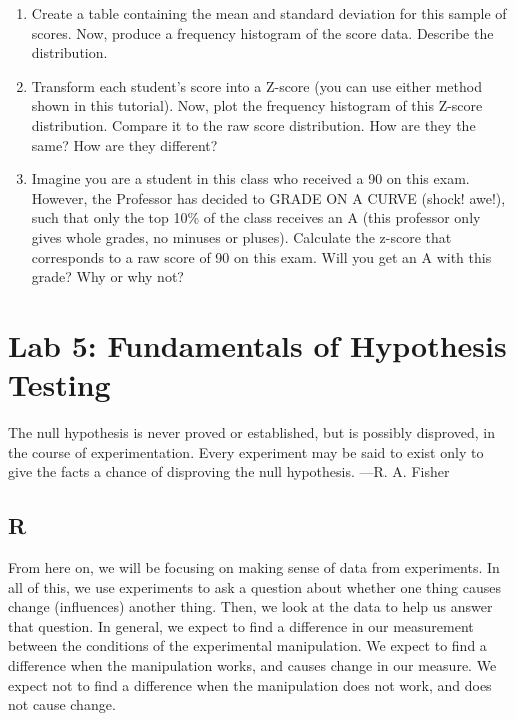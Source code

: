 \documentclass[
]{book}
\begin{document}
\begin{enumerate}
\def\labelenumi{\arabic{enumi}.}
\item
  Create a table containing the mean and standard deviation for this
  sample of scores. Now, produce a frequency histogram of the score
  data. Describe the distribution.
\item
  Transform each student's score into a Z-score (you can use either
  method shown in this tutorial). Now, plot the frequency histogram of
  this Z-score distribution. Compare it to the raw score distribution.
  How are they the same? How are they different?
\item
  Imagine you are a student in this class who received a 90 on this
  exam. However, the Professor has decided to GRADE ON A CURVE (shock!
  awe!), such that only the top 10\% of the class receives an A (this
  professor only gives whole grades, no minuses or pluses). Calculate
  the z-score that corresponds to a raw score of 90 on this exam. Will
  you get an A with this grade? Why or why not?
\end{enumerate}

\hypertarget{lab-5-fundamentals-of-hypothesis-testing}{%
\chapter{Lab 5: Fundamentals of Hypothesis Testing}\label{lab-5-fundamentals-of-hypothesis-testing}}

{The null hypothesis is never proved or established, but is possibly disproved, in the course of experimentation. Every experiment may be said to exist only to give the facts a chance of disproving the null hypothesis. ---R. A. Fisher}

\hypertarget{r-5}{%
\section{R}\label{r-5}}

From here on, we will be focusing on making sense of data from experiments. In all of this, we use experiments to ask a question about whether one thing causes change (influences) another thing. Then, we look at the data to help us answer that question. In general, we expect to find a difference in our measurement between the conditions of the experimental manipulation. We expect to find a difference when the manipulation works, and causes change in our measure. We expect not to find a difference when the manipulation does not work, and does not cause change.
\end{document}
